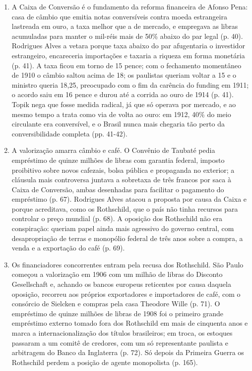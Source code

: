 \begin{enumerate}[leftmargin=*,nosep]
\item A Caixa de Conversão é o fundamento da reforma financeira de Afonso Pena:
casa de câmbio que emitia notas conversíveis contra moeda estrangeira lastreada
em ouro, a taxa melhor que a de mercado, e empregava as libras acumuladas para
manter o mil-réis mais de 50\% abaixo do par legal (p. 40). Rodrigues Alves a
vetara porque taxa abaixo do par afugentaria o investidor estrangeiro,
encareceria importações e taxaria a riqueza em forma monetária (p. 41). A taxa
ficou em torno de 15 pence; com o fechamento momentâneo de 1910 o câmbio saltou
acima de 18; os paulistas queriam voltar a 15 e o ministro queria 18,25,
preocupado com o fim da carência do funding em 1911; o acordo saiu em 16 pence e
durou até a corrida ao ouro de 1914 (p. 41). Topik nega que fosse medida radical,
já que só operava por mercado, e ao mesmo tempo a trata como via de volta ao
ouro: em 1912, 40\% do meio circulante era conversível, e o Brasil nunca mais
chegaria tão perto da conversibilidade completa (pp. 41-42).



\item A valorização amarra câmbio e café. O Convênio de Taubaté pedia empréstimo
de quinze milhões de libras com garantia federal, imposto proibitivo sobre novos
cafezais, bolsa pública e propaganda no exterior; a cláusula mais controversa
juntava a sobretaxa de três francos por saca à Caixa de Conversão, ambas
desenhadas para facilitar o pagamento do empréstimo (p. 67). Rodrigues Alves
atacou a proposta por causa da Caixa e porque acreditava, como os Rothschild, que
o país não tinha recursos para controlar o preço mundial (p. 68). A oposição dos
Rothschild não era conspiração: queriam papel ainda mais agressivo do governo
central, com desapropriação de terras e monopólio federal de três anos sobre a
compra, a venda e a exportação do café (p. 69).

\item Os financiadores concorrentes entram pela recusa dos Rothschild. São Paulo
começou a valorização em 1906 com um milhão de libras do Disconto Gesellschaft e,
achando os bancos europeus reticentes por causa daquela oposição, recorreu aos
próprios exportadores e importadores de café, com o consórcio de Sielcken e
compras pela casa Theodore Wille (p. 71). O empréstimo de quinze milhões de
libras de 1908 foi o primeiro grande empréstimo externo tomado fora dos
Rothschild em mais de cinquenta anos e marca a internacionalização dos títulos
brasileiros; em troca, os estoques passaram a um comitê de credores, com um só
representante paulista e arbitragem do Banco da Inglaterra (p. 72). Só depois da
Primeira Guerra os Rothschild perdem a posição de agente monopolista (p. 165).


\end{enumerate}
